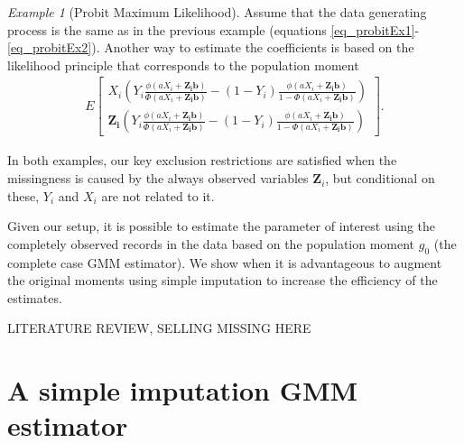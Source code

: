 \documentclass{article}
\theoremstyle{definition}
\theoremstyle{remark}
\newtheorem{example}{Example}
\begin{document}
\begin{example}[Probit Maximum Likelihood]
	Assume that the data generating process is the same as in the previous example (equations \eqref{eq_probitEx1}-\eqref{eq_probitEx2}). Another way to estimate the coefficients is based on the likelihood principle that corresponds to the population moment
	\begin{align*}
	E\left[\begin{array}{c}
	X_i\left(Y_i \frac{\phi(aX_i+\mathbf{Z_ib})}{\Phi(aX_i+\mathbf{Z_ib})} - (1-Y_i)\frac{\phi(aX_i+\mathbf{Z_ib})}{1-\Phi(aX_i+\mathbf{Z_ib})}\right) \\
	\mathbf{Z_i}\left(Y_i \frac{\phi(aX_i+\mathbf{Z_ib})}{\Phi(aX_i+\mathbf{Z_ib})} - (1-Y_i)\frac{\phi(aX_i+\mathbf{Z_ib})}{1-\Phi(aX_i+\mathbf{Z_ib})}\right)
	\end{array}
	\right].
	\end{align*}
\end{example}
In both examples, our key exclusion restrictions are satisfied when the missingness is caused by the always observed variables $\mathbf{Z}_i$, but conditional on these, $Y_i$ and $X_i$ are not related to it.

Given our setup, it is possible to estimate the parameter of interest using the completely observed records in the data based on the population moment $g_0$ (the complete case GMM estimator). We show when it is advantageous to augment the original moments using simple imputation to increase the efficiency of the estimates. 

{\color{red} LITERATURE REVIEW, SELLING MISSING HERE}

\section{A simple imputation GMM estimator}
\end{document}
